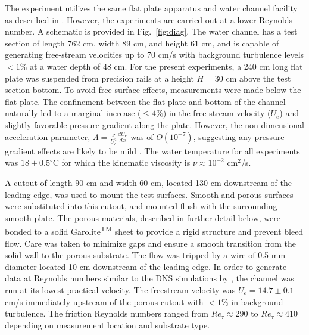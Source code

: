 \documentclass[letterpaper,11pt]{article}
\newcommand{\Ret}{Re_\tau}
\begin{document}
The experiment utilizes the same flat plate apparatus and water channel facility as described in \citet{efstathiou2018mean}.  However, the experiments are carried out at a lower Reynolds number. A schematic is provided in Fig.~\ref{fig:diag}.  The water channel has a test section of length 762 cm, width 89 cm, and height 61 cm, and is capable of generating free-stream velocities up to 70 cm/s with background turbulence levels $<1\%$ at a water depth of 48 cm. For the present experiments, a 240 cm long flat plate was suspended from precision rails at a height $H=30$ cm above the test section bottom. To avoid free-surface effects, measurements were made below the flat plate. The confinement between the flat plate and bottom of the channel naturally led to a marginal increase ($\leq 4\%$) in the free stream velocity ($U_e$) and slightly favorable pressure gradient along the plate. However, the non-dimensional acceleration parameter, $\Lambda = \frac{\nu}{U_e^2} \frac{d U_e}{dx}$ was of $O(10^{-7})$, suggesting any pressure gradient effects are likely to be mild \citep{PatelPreston1965,de2000reynolds,schultz2007rough}. The water temperature for all experiments was $18\pm 0.5^\circ$C for which the kinematic viscosity is $\nu \approx  10^{-2}$ cm$^2$/s.

A cutout of length 90 cm and width 60 cm, located 130 cm downstream of the leading edge, was used to mount the test surfaces. Smooth and porous surfaces were substituted into this cutout, and mounted flush with the surrounding smooth plate. The porous materials, described in further detail below, were bonded to a solid Garolite\textsuperscript{TM} sheet to provide a rigid structure and prevent bleed flow. Care was taken to minimize gaps and ensure a smooth transition from the solid wall to the porous substrate.  The flow was tripped by a wire of 0.5 mm diameter located 10 cm downstream of the leading edge. In order to generate data at Reynolds numbers similar to the DNS simulations by \citet{gomez2019turbulent}, the channel was run at its lowest practical velocity. The freestream velocity was $U_e = 14.7 \pm 0.1$ cm/s immediately upstream of the porous cutout with $<1\%$ in background turbulence.  The friction Reynolds numbers ranged from $\Ret \approx 290$ to $\Ret \approx 410$ depending on measurement location and substrate type. 
\end{document}
